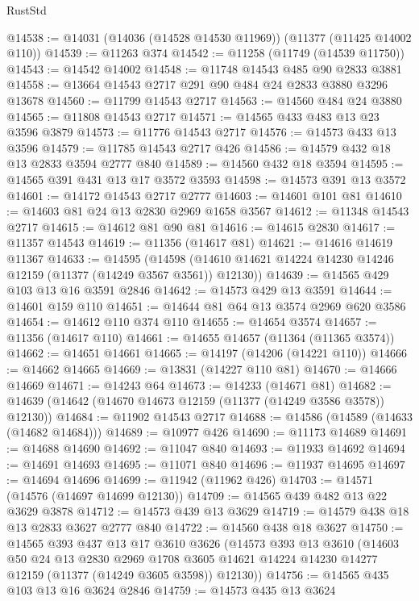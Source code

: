 \begin{lexlean}{RustStd}
\begin{coremodule}
@14538 := @14031 (@14036 (@14528 @14530 @11969)) (@11377 (@11425 @14002 @110))
@14539 := @11263 @374
@14542 := @11258 (@11749 (@14539 @11750))
@14543 := @14542 @14002
@14548 := @11748 @14543 @485 @90 @2833 @3881
@14558 := @13664 @14543 @2717 @291 @90 @484 @24 @2833 @3880 @3296 @13678
@14560 := @11799 @14543 @2717
@14563 := @14560 @484 @24 @3880
@14565 := @11808 @14543 @2717
@14571 := @14565 @433 @483 @13 @23 @3596 @3879
@14573 := @11776 @14543 @2717
@14576 := @14573 @433 @13 @3596
@14579 := @11785 @14543 @2717 @426
@14586 := @14579 @432 @18 @13 @2833 @3594 @2777 @840
@14589 := @14560 @432 @18 @3594
@14595 := @14565 @391 @431 @13 @17 @3572 @3593
@14598 := @14573 @391 @13 @3572
@14601 := @14172 @14543 @2717 @2777
@14603 := @14601 @101 @81
@14610 := @14603 @81 @24 @13 @2830 @2969 @1658 @3567
@14612 := @11348 @14543 @2717
@14615 := @14612 @81 @90 @81
@14616 := @14615 @2830
@14617 := @11357 @14543
@14619 := @11356 (@14617 @81)
@14621 := @14616 @14619 @11367
@14633 := @14595
    (@14598 (@14610 @14621 @14224 @14230 @14246 @12159 (@11377 (@14249 @3567 @3561)) @12130))
@14639 := @14565 @429 @103 @13 @16 @3591 @2846
@14642 := @14573 @429 @13 @3591
@14644 := @14601 @159 @110
@14651 := @14644 @81 @64 @13 @3574 @2969 @620 @3586
@14654 := @14612 @110 @374 @110
@14655 := @14654 @3574
@14657 := @11356 (@14617 @110)
@14661 := @14655 @14657 (@11364 (@11365 @3574))
@14662 := @14651 @14661
@14665 := @14197 (@14206 (@14221 @110))
@14666 := @14662 @14665
@14669 := @13831 (@14227 @110 @81)
@14670 := @14666 @14669
@14671 := @14243 @64
@14673 := @14233 (@14671 @81)
@14682 := @14639 (@14642 (@14670 @14673 @12159 (@11377 (@14249 @3586 @3578)) @12130))
@14684 := @11902 @14543 @2717
@14688 := @14586 (@14589 (@14633 (@14682 @14684)))
@14689 := @10977 @426
@14690 := @11173 @14689
@14691 := @14688 @14690
@14692 := @11047 @840
@14693 := @11933 @14692
@14694 := @14691 @14693
@14695 := @11071 @840
@14696 := @11937 @14695
@14697 := @14694 @14696
@14699 := @11942 (@11962 @426)
@14703 := @14571 (@14576 (@14697 @14699 @12130))
@14709 := @14565 @439 @482 @13 @22 @3629 @3878
@14712 := @14573 @439 @13 @3629
@14719 := @14579 @438 @18 @13 @2833 @3627 @2777 @840
@14722 := @14560 @438 @18 @3627
@14750 := @14565
    @393
    @437
    @13
    @17
    @3610
    @3626
    (@14573
      @393
      @13
      @3610
      (@14603
        @50
        @24
        @13
        @2830
        @2969
        @1708
        @3605
        @14621
        @14224
        @14230
        @14277
        @12159
        (@11377 (@14249 @3605 @3598))
        @12130))
@14756 := @14565 @435 @103 @13 @16 @3624 @2846
@14759 := @14573 @435 @13 @3624

\end{coremodule}
\end{lexlean}
